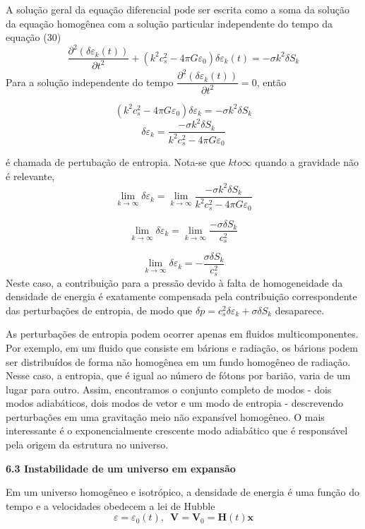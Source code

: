 \documentclass[a4paper,12pt]{article}
\begin{document}
A solução geral da equação diferencial pode ser escrita como a soma da solução da equação homogênea com a solução particular independente do tempo da equação (30)
$$\dfrac{\partial^2 (\delta\varepsilon_k (t))}{\partial t^2} +(k^2c^2_s - 4\pi G\varepsilon_0)\delta\varepsilon_k (t) = -\sigma k^2 \delta S_k$$
Para a solução independente do tempo $\dfrac{\partial^2 (\delta\varepsilon_k (t))}{\partial t^2} = 0$, então

$$(k^2c^2_s - 4\pi G\varepsilon_0)\delta\varepsilon_k = -\sigma k^2 \delta S_k$$
\begin{equation}\label{eq31}
	\delta\varepsilon_k  = \dfrac{ -\sigma k^2 \delta S_k}{k^2c^2_s - 4\pi G\varepsilon_0}
\end{equation}

é chamada de pertubação de entropia. Nota-se que $k to \infty$ quando a gravidade não é relevante, 
$$\lim_{k \to\infty}\delta\varepsilon_k = \lim_{k \to\infty}\dfrac{ -\sigma k^2 \delta S_k}{k^2c^2_s - 4\pi G\varepsilon_0}$$

$$\lim_{k \to\infty}\delta\varepsilon_k = \lim_{k \to\infty}\dfrac{ -\sigma \delta S_k}{c^2_s}$$

$$\lim_{k \to\infty}\delta\varepsilon_k =-\dfrac{ \sigma \delta S_k}{c^2_s}$$
Neste caso, a contribuição para a pressão devido à falta de homogeneidade da densidade de energia é exatamente compensada pela contribuição correspondente das perturbações de entropia, de modo que $\delta p = c_s^2 \delta\varepsilon_k + \sigma\delta S_k$ desaparece. 

As perturbações de entropia podem ocorrer apenas em fluidos multicomponentes. Por exemplo, em um fluido que consiste em bárions e radiação, os bárions podem ser distribuídos de forma não homogênea em um fundo homogêneo de radiação. Nesse caso, a entropia, que é igual ao número de fótons por barião, varia de um lugar para outro.
Assim, encontramos o conjunto completo de modos - dois modos adiabáticos, dois
modos de vetor e um modo de entropia - descrevendo perturbações em uma gravitação
meio não expansível homogêneo. O mais interessante é o exponencialmente
crescente modo adiabático que é responsável pela origem da estrutura no
universo.

\begin{center}
	\textbf{6.3 Instabilidade de um universo em expansão}
\end{center}

Em um universo homogêneo e isotrópico, a densidade de energia é uma função do tempo e a velocidades obedecem a lei de Hubble
\begin{equation}\label{eq32}
	\varepsilon = \varepsilon_0 (t), \,\,\, \mathbf{V} = \mathbf{V}_0 = \mathbf{H} (t) \mathbf{x}
\end{equation}
\end{document}
